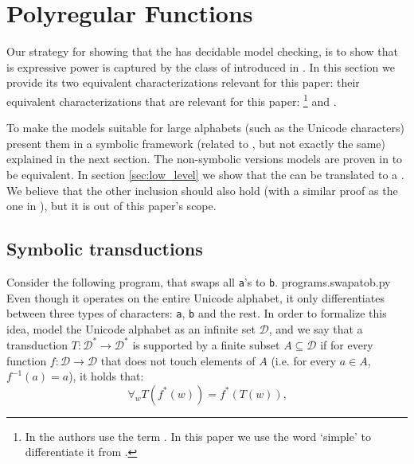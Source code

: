 \newpage
\section{Polyregular Functions}
\label{sec:polyregular}

Our strategy for showing that the  has decidable model checking,
is to show that is expressive power is captured by the class of 
introduced in \cite{bojanczyk2018polyregular}. In this section we provide its two equivalent characterizations 
relevant for this paper:
their equivalent characterizations
that are relevant for this paper: \footnote{
    In \cite{bojanczyk2018polyregular} the authors use the term . 
    In this paper we use the word `simple' to differentiate it from . 
} \cite[p. 19]{bojanczyk2018polyregular} and 
\cite[Definition 4]{bojanczyk2019string}.

To make the models suitable for large alphabets (such as the Unicode characters)
present them in a symbolic framework (related to \cite{d2017power}, but not exactly the same) explained in the next section.
The non-symbolic versions models are proven in \cite{bojanczyk2018polyregular} to be equivalent.
In section \ref{sec:low_level} we show that the 
can be translated to a .
We believe that the other inclusion should also hold (with a similar proof as the one in \cite{bojanczyk2018polyregular}),
but it is out of this paper's scope.

\subsection{Symbolic transductions}
Consider the following program, that swaps all \texttt{a}'s to \texttt{b}.
programs.swapatob.py
Even though it operates on the entire Unicode alphabet, it only differentiates between three types of characters:
\texttt{a}, \texttt{b} and the rest. In order to formalize this idea, model the Unicode alphabet as an infinite set $\mathcal{D}$,
and we say that a transduction $T : \mathcal{D}^* \to \mathcal{D}^*$ is supported by a finite subset $A \subseteq \mathcal{D}$ if
for every function $f: \mathcal{D} \to \mathcal{D}$ that does not touch elements of $A$ (i.e. for every $a \in A$,  $f^{-1}(a) = {a}$),
it holds that: 
\[ \forall_{w} T(f^*(w)) = f^*(T(w))\texttt{,} \]

